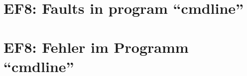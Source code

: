 
\thispagestyle{empty}
\ifenglish
\section*{EF8: Faults in program ``cmdline''}

\fi
\ifgerman
\section*{EF8: Fehler im Programm ``cmdline''}

\fi

